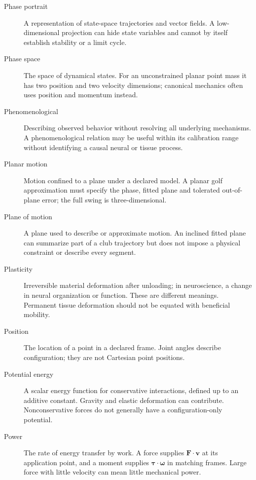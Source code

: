 \begin{description}
\item[Phase portrait] A representation of state-space trajectories and vector fields. A low-dimensional projection can hide state variables and cannot by itself establish stability or a limit cycle.

\item[Phase space] The space of dynamical states. For an unconstrained planar point mass it has two position and two velocity dimensions; canonical mechanics often uses position and momentum instead.

\item[Phenomenological] Describing observed behavior without resolving all underlying mechanisms. A phenomenological relation may be useful within its calibration range without identifying a causal neural or tissue process.

\item[Planar motion] Motion confined to a plane under a declared model. A planar golf approximation must specify the phase, fitted plane and tolerated out-of-plane error; the full swing is three-dimensional.

\item[Plane of motion] A plane used to describe or approximate motion. An inclined fitted plane can summarize part of a club trajectory but does not impose a physical constraint or describe every segment.

\item[Plasticity] Irreversible material deformation after unloading; in neuroscience, a change in neural organization or function. These are different meanings. Permanent tissue deformation should not be equated with beneficial mobility.

\item[Position] The location of a point in a declared frame. Joint angles describe configuration; they are not Cartesian point positions.

\item[Potential energy] A scalar energy function for conservative interactions, defined up to an additive constant. Gravity and elastic deformation can contribute. Nonconservative forces do not generally have a configuration-only potential.

\item[Power] The rate of energy transfer by work. A force supplies $\mathbf{F}\cdot\mathbf{v}$ at its application point, and a moment supplies $\boldsymbol{\tau}\cdot\boldsymbol{\omega}$ in matching frames. Large force with little velocity can mean little mechanical power.


\end{description}
